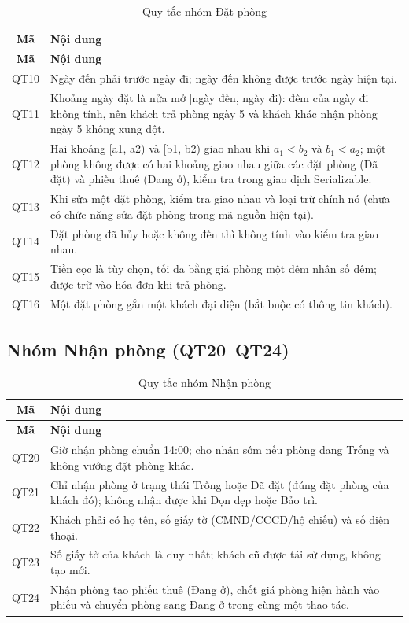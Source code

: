 \documentclass[14pt]{report}
\begin{document}
\begin{longtable}{|c|p{12cm}|}
\caption{Quy tắc nhóm Đặt phòng}\\\hline
\textbf{Mã} & \textbf{Nội dung}\\\hline
\endfirsthead
\hline \textbf{Mã} & \textbf{Nội dung}\\\hline
\endhead
QT10 & Ngày đến phải trước ngày đi; ngày đến không được trước ngày hiện tại. \\\hline
QT11 & Khoảng ngày đặt là nửa mở [ngày đến, ngày đi): đêm của ngày đi không tính, nên khách trả phòng ngày 5 và khách khác nhận phòng ngày 5 không xung đột. \\\hline
QT12 & Hai khoảng [a1, a2) và [b1, b2) giao nhau khi $a_1 < b_2$ và $b_1 < a_2$; một phòng không được có hai khoảng giao nhau giữa các đặt phòng (Đã đặt) và phiếu thuê (Đang ở), kiểm tra trong giao dịch Serializable. \\\hline
QT13 & Khi sửa một đặt phòng, kiểm tra giao nhau và loại trừ chính nó (chưa có chức năng sửa đặt phòng trong mã nguồn hiện tại). \\\hline
QT14 & Đặt phòng đã hủy hoặc không đến thì không tính vào kiểm tra giao nhau. \\\hline
QT15 & Tiền cọc là tùy chọn, tối đa bằng giá phòng một đêm nhân số đêm; được trừ vào hóa đơn khi trả phòng. \\\hline
QT16 & Một đặt phòng gắn một khách đại diện (bắt buộc có thông tin khách). \\\hline
\end{longtable}

\subsection{Nhóm Nhận phòng (QT20--QT24)}

\begin{longtable}{|c|p{12cm}|}
\caption{Quy tắc nhóm Nhận phòng}\\\hline
\textbf{Mã} & \textbf{Nội dung}\\\hline
\endfirsthead
\hline \textbf{Mã} & \textbf{Nội dung}\\\hline
\endhead
QT20 & Giờ nhận phòng chuẩn 14:00; cho nhận sớm nếu phòng đang Trống và không vướng đặt phòng khác. \\\hline
QT21 & Chỉ nhận phòng ở trạng thái Trống hoặc Đã đặt (đúng đặt phòng của khách đó); không nhận được khi Dọn dẹp hoặc Bảo trì. \\\hline
QT22 & Khách phải có họ tên, số giấy tờ (CMND/CCCD/hộ chiếu) và số điện thoại. \\\hline
QT23 & Số giấy tờ của khách là duy nhất; khách cũ được tái sử dụng, không tạo mới. \\\hline
QT24 & Nhận phòng tạo phiếu thuê (Đang ở), chốt giá phòng hiện hành vào phiếu và chuyển phòng sang Đang ở trong cùng một thao tác. \\\hline
\end{longtable}
\end{document}

